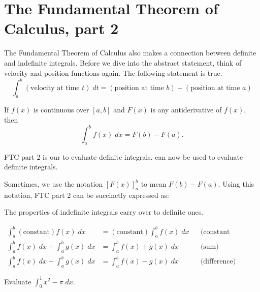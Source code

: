 \documentclass[../main.tex]{subfiles}
\begin{document}
 \section{The Fundamental Theorem of Calculus, part 2}
The Fundamental Theorem of Calculus also makes a connection between definite and indefinite integrals. Before we dive into the abstract statement, think of velocity and position functions again. The following statement is true.
\[
  \int_{a}^{b} \left(\text{velocity at time \(t\)}\right) \;dt  = (\text{position at time \(b\)}) - (\text{position at time \(a\)})
\]

\begin{thm} \label{thm:ftc-part-two}
  If \(f(x)\) is continuous over \([a,b]\) and \(F(x)\) is any antiderivative of \(f(x)\), then
  \[
    \int_{a}^{b} f(x) \;dx = F(b) - F(a).
  \]

\end{thm}

FTC part 2 is our  to evaluate definite integrals.  can now be used to evaluate definite integrals.

Sometimes, we use the notation \([F(x)]_{a}^{b}\) to mean \(F(b) - F(a)\). Using this notation, FTC part 2 can be succinctly expressed as:

\blanks*

The properties of indefinite integrals carry over to definite ones.
\begin{thm}
  \begin{align*}
    \int_{a}^{b} (\text{constant}) f(x) \;dx &= (\text{constant}) \int_{a}^{b} f(x) \;dx && \text{(constant multiple)}\\[1ex]
    \int_{a}^{b} f(x) \;dx + \int_{a}^{b} g(x) \;dx &= \int_{a}^{b} f(x) + g(x) \;dx && \text{(sum)} \\[1ex]
    \int_{a}^{b} f(x) \;dx - \int_{a}^{b} g(x) \;dx &= \int_{a}^{b} f(x) - g(x) \;dx && \text{(difference)}
  \end{align*}

\end{thm}
\clearpage

\begin{example}
  Evaluate \(\int_{0}^{1} x^{2} - \pi \;dx\).

\end{example}
\clearpage
\end{document}
